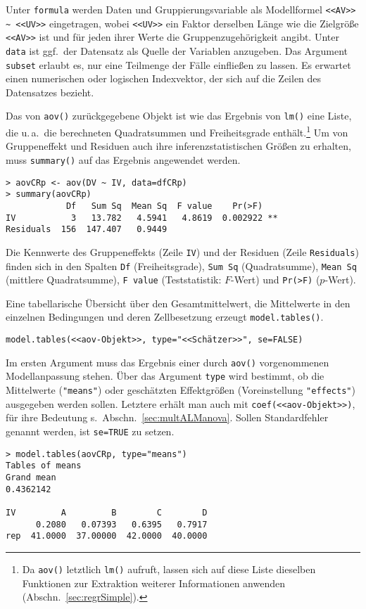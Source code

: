 Unter \lstinline!formula! werden Daten und Gruppierungsvariable als Modellformel \lstinline!<<AV>> ~ <<UV>>! eingetragen, wobei \lstinline!<<UV>>! ein Faktor derselben Länge wie die Zielgröße \lstinline!<<AV>>! ist und für jeden ihrer Werte die Gruppenzugehörigkeit angibt. Unter \lstinline!data! ist ggf.\ der Datensatz als Quelle der Variablen anzugeben. Das Argument \lstinline!subset! erlaubt es, nur eine Teilmenge der Fälle einfließen zu lassen. Es erwartet einen numerischen oder logischen Indexvektor, der sich auf die Zeilen des Datensatzes bezieht.

Das von \lstinline!aov()! zurückgegebene Objekt ist wie das Ergebnis von \lstinline!lm()! eine Liste, die u.\,a.\ die berechneten Quadratsummen und Freiheitsgrade enthält.\footnote{Da \lstinline!aov()! letztlich \lstinline!lm()! aufruft, lassen sich auf diese Liste dieselben Funktionen zur Extraktion weiterer Informationen anwenden (Abschn.\ \ref{sec:regrSimple}).} Um von Gruppeneffekt und Residuen auch ihre inferenzstatistischen Größen zu erhalten, muss \lstinline!summary()! auf das Ergebnis angewendet werden.
\begin{lstlisting}
> aovCRp <- aov(DV ~ IV, data=dfCRp)
> summary(aovCRp)
            Df   Sum Sq  Mean Sq  F value    Pr(>F)
IV           3   13.782   4.5941   4.8619  0.002922 **
Residuals  156  147.407   0.9449
\end{lstlisting}

Die Kennwerte des Gruppeneffekts (Zeile \lstinline!IV!) und der Residuen (Zeile \lstinline!Residuals!) finden sich in den Spalten \lstinline!Df! (Freiheitsgrade), \lstinline!Sum Sq! (Quadratsumme), \lstinline!Mean Sq! (mittlere Quadratsumme), \lstinline!F value! (Teststatistik: $F$-Wert) und \lstinline!Pr(>F)! ($p$-Wert).

Eine tabellarische Übersicht über den Gesamtmittelwert, die Mittelwerte in den einzelnen Bedingungen und deren Zellbesetzung erzeugt \lstinline!model.tables()!.
\begin{lstlisting}
model.tables(<<aov-Objekt>>, type="<<Schätzer>>", se=FALSE)
\end{lstlisting}

Im ersten Argument muss das Ergebnis einer durch \lstinline!aov()! vorgenommenen Modellanpassung stehen. Über das Argument \lstinline!type! wird bestimmt, ob die Mittelwerte (\lstinline!"means"!) oder geschätzten Effektgrößen (Voreinstellung \lstinline!"effects"!) ausgegeben werden sollen. Letztere erhält man auch mit \lstinline!coef(<<aov-Objekt>>)!, für ihre Bedeutung s.\ Abschn.\ \ref{sec:multALManova}. Sollen Standardfehler genannt werden, ist \lstinline!se=TRUE! zu setzen.
\begin{lstlisting}
> model.tables(aovCRp, type="means")
Tables of means
Grand mean
0.4362142

IV         A         B        C        D
      0.2080   0.07393   0.6395   0.7917
rep  41.0000  37.00000  42.0000  40.0000
\end{lstlisting}

